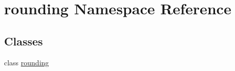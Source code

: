 \section{rounding Namespace Reference}
\label{namespacerounding}
\subsection*{Classes}
\begin{DoxyCompactItemize}
\item 
class \hyperlink{classrounding_1_1rounding}{rounding}
\end{DoxyCompactItemize}
